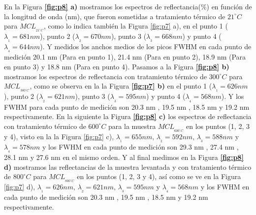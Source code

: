 \documentclass[a4paper,11pt,]{book}
\begin{document}
En la Figura \textbf{\ref{fig:p8} a)}  mostramos los espectros de reflectancia($\%$) en función de la longitud de onda (nm), que fueron sometidas a tratamiento térmico de $21^{\circ} C$ para $MCL_{_{21^{\circ} C}}$, como lo indica también la Figura \ref{fig:p7} a),  en el punto 1 ($\lambda_{_{1}}=681 nm$), punto 2 ($\lambda_{_{2}}=670 nm$), punto 3 ($\lambda_{_{3}}=668 nm$) y punto 4 ($\lambda_{_{4}}=644 nm$). Y medidos los anchos medios de los picos FWHM en cada punto de medición  20.1 nm (Para en punto 1),  21.4 nm (Para en punto 2),  18.9 nm (Para en punto 3) y  18.8 nm (Para en punto 4). Pasamos a la Figura \textbf{\ref{fig:p8} b)}  mostramos los espectros de reflectancia  con tratamiento térmico de $300^{\circ} C$ para $MCL_{_{300^{\circ} C}}$, como se observa en la la Figura\textbf{ \ref{fig:p7} b)}  en el punto 1 ($\lambda_{_{1}}=626 nm$), punto 2 ($\lambda_{_{2}}=621 nm$), punto 3 ($\lambda_{_{3}}=595 nm$) y punto 4 ($\lambda_{_{4}}=568 nm$). Y  los  FWHM  para cada punto de medición son  20.3 nm ,  19.5 nm ,  18.5 nm  y  19.2 nm respectivamente. En la siguiente la Figura \textbf{\ref{fig:p8} c)}  los espectros de reflectancia con tratamiento térmico de $600^{\circ} C$ para la muestra $MCL_{_{600^{\circ} C}}$  en los  puntos (1, 2, 3 y 4), visto en la la Figura \ref{fig:p7} c),  $\lambda_{_{1}}=655 nm$,  $\lambda_{_{2}}=592 nm$,  $\lambda_{_{3}}=588 nm$ y  $\lambda_{_{4}}=578 nm$ y los FWHM  en cada punto de medición son 29.3 nm ,  27.4 nm ,  28.1 nm  y  27.6 nm en el mismo orden. Y al final medimos en  la Figura \textbf{\ref{fig:p8} d)} mostramos las reflectancias de la muestra levantada y  con tratamiento térmico de $800^{\circ} C$ para  $MCL_{_{800^{\circ} C}}$ en los  puntos (1, 2, 3 y 4), así como se ve en la Figura \ref{fig:p7} d), $\lambda_{_{1}}=626 nm$, $\lambda_{_{2}}=621 nm$,  $\lambda_{_{3}}=595 nm$ y $\lambda_{_{4}}=568 nm$  y los FWHM  en cada punto de medición son 20.3 nm ,  19.5 nm ,  18.5 nm  y  19.2 nm  respectivamente.
\end{document}
